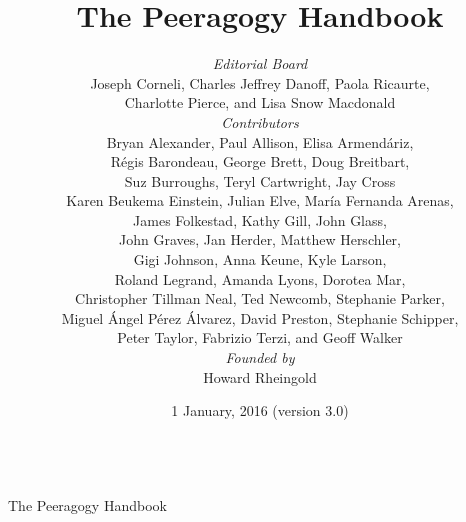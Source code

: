 \documentclass[ebook, 12pt, twoside]{memoir}
\begin{document}
%
\sloppy \pagestyle{empty} \thispagestyle{empty}
\begin{center}
\quad\\[1in] 
{\LARGE The Peeragogy Handbook}
\end{center}
\clearpage\mbox{}\clearpage    %
\title{The Peeragogy Handbook\\[.5in]}
\author{

\emph{Editorial Board}\\
{\small Joseph Corneli, Charles Jeffrey Danoff, Paola Ricaurte,}\\
{\small Charlotte Pierce, and Lisa Snow Macdonald} \\[.25in]

\emph{Contributors} \\
{\small Bryan Alexander, Paul Allison, Elisa Armend\'ariz,} \\
{\small R\'egis Barondeau, George Brett, Doug Breitbart,}\\ 
{\small Suz Burroughs, Teryl Cartwright, Jay Cross}\\
{\small Karen Beukema Einstein, Julian Elve, Mar\'ia Fernanda Arenas,}\\
{\small James Folkestad, Kathy Gill, John Glass,} \\
{\small John Graves, Jan Herder, Matthew Herschler,} \\
{\small Gigi Johnson, Anna Keune, Kyle Larson,} \\
{\small Roland Legrand, Amanda Lyons, Dorotea Mar,} \\
{\small Christopher Tillman Neal, Ted Newcomb, Stephanie Parker,} \\
{\small Miguel \'Angel P\'erez \'Alvarez, David Preston, Stephanie Schipper,} \\
{\small Peter Taylor, Fabrizio Terzi, and Geoff Walker}\\[.25in]

\emph{Founded by}\\
{\small Howard Rheingold}\\[.25in]
}

\date{1 January, 2016 (version 3.0)}
\maketitle
\thispagestyle{empty}
\end{document}
